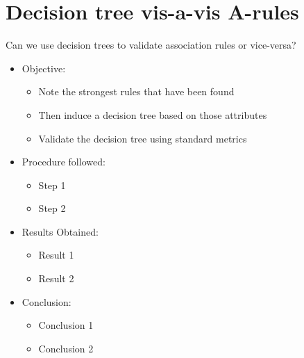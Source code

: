 \chapter{Decision tree vis-a-vis A-rules}
Can we use decision trees to validate association rules or vice-versa?
\begin{itemize}
	\item
	Objective:
	\begin{itemize}
		\item
		Note the strongest rules that have been found
		\item
		Then induce a decision tree based on those attributes
		\item
		Validate the decision tree using standard metrics
	\end{itemize}
	
	\item
	Procedure followed: 
	\begin{itemize}
		\item
		Step 1
		\item
		Step 2
	\end{itemize}
	
	\item
	Results Obtained:
	\begin{itemize}
		\item
		Result 1
		\item
		Result 2
	\end{itemize}
	
	\item
	Conclusion:
	\begin{itemize}
		\item
		Conclusion 1
		\item
		Conclusion 2
	\end{itemize}
\end{itemize}